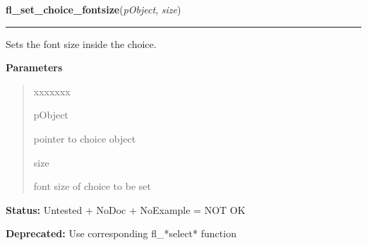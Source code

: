 \hspace{.8\funcindent}\begin{boxedminipage}{\funcwidth}

    \raggedright \textbf{fl\_set\_choice\_fontsize}(\textit{pObject}, \textit{size})

    \vspace{-1.5ex}

    \rule{\textwidth}{0.5\fboxrule}
\setlength{\parskip}{2ex}
    Sets the font size inside the choice.

\setlength{\parskip}{1ex}
      \textbf{Parameters}
      \vspace{-1ex}

      \begin{quote}
        \begin{Ventry}{xxxxxxx}

          \item[pObject]

          pointer to choice object

          \item[size]

          font size of choice to be set

        \end{Ventry}

      \end{quote}

\textbf{Status:} Untested + NoDoc + NoExample = NOT OK



\textbf{Deprecated:} Use corresponding fl\_*select* function



    \end{boxedminipage}

    \label{xformslib:library:fl_set_choice_fontstyle}

    \vspace{0.5ex}

